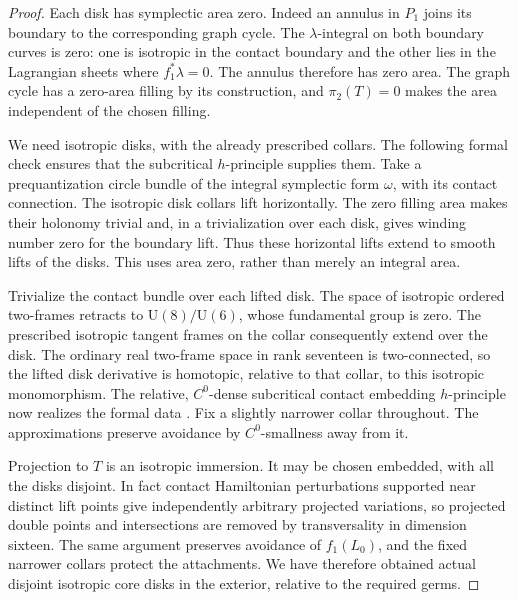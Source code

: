 \documentclass[11pt]{article}
\theoremstyle{definition}
\theoremstyle{remark}
\numberwithin{equation}{section}
\begin{document}
\begin{proof}
Each disk has symplectic area zero.  Indeed an annulus in $P_1$
joins its boundary to the corresponding graph cycle.  The
$\lambda$-integral on both boundary curves is zero: one is
isotropic in the contact boundary and the other lies in the
Lagrangian sheets where $f_1^*\lambda=0$.  The annulus therefore
has zero area.  The graph cycle has a zero-area filling by its
construction, and $\pi_2(T)=0$ makes the area independent of
the chosen filling.

We need isotropic disks, with the already prescribed collars.
The following formal check ensures that the subcritical
$h$-principle supplies them.  Take a prequantization circle bundle
of the integral symplectic form $\omega$, with its contact
connection.  The isotropic disk collars lift horizontally.  The
zero filling area makes their holonomy trivial and, in a
trivialization over each disk, gives winding number zero for the
boundary lift.  Thus these horizontal lifts extend to smooth
lifts of the disks.  This uses area zero, rather than merely an
integral area.

Trivialize the contact bundle over each lifted disk.  The space
of isotropic ordered two-frames retracts to $\mathrm U(8)/\mathrm
U(6)$, whose fundamental group is zero.  The prescribed
isotropic tangent frames on the collar consequently extend
over the disk.  The ordinary real two-frame space in rank
seventeen is two-connected, so the lifted disk derivative is
homotopic, relative to that collar, to this isotropic
monomorphism.  The relative, $C^0$-dense subcritical contact
embedding $h$-principle now realizes the formal data
\cite[Theorem~12.4.1]{gromov-flexibility}.  Fix a slightly narrower collar
throughout.  The approximations preserve avoidance by
$C^0$-smallness away from it.

Projection to $T$ is an isotropic immersion.  It may be chosen
embedded, with all the disks disjoint.  In fact contact
Hamiltonian perturbations supported near distinct lift points
give independently arbitrary projected variations, so projected
double points and intersections are removed by transversality
in dimension sixteen.  The same argument preserves avoidance
of $f_1(L_0)$, and the fixed narrower collars protect the
attachments.  We have therefore obtained actual disjoint
isotropic core disks in the exterior, relative to the required
germs.


\end{proof}
\end{document}
